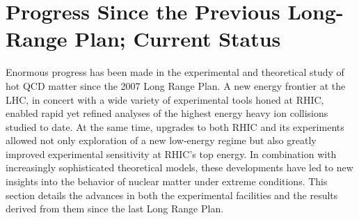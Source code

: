 \section{Progress Since the Previous Long-Range Plan; Current Status}
\label{Sec:Progress}
Enormous progress has been made in the experimental and theoretical study of hot QCD matter since the 
2007 Long Range Plan\cite{LRP:2007}. A new energy frontier at the LHC, in concert with a wide variety
of experimental tools honed at RHIC, enabled rapid yet refined
analyses of the highest energy heavy ion collisions studied to date.
At the same time, upgrades to both RHIC and its experiments allowed
not only exploration of a new low-energy regime but also greatly improved
experimental sensitivity at RHIC's top energy. In combination with increasingly sophisticated
theoretical models, these developments have led to new insights into the behavior
of nuclear matter under extreme conditions. This section details
the advances in both the experimental facilities
and the results derived from them since the last Long Range Plan.


















